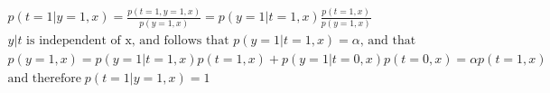 

	
	
	\begin{answer}
\begin{align*}
p(t=1|y=1,x) = \frac{p(t=1,y=1,x)}{p(y=1,x)} = p(y=1|t=1,x) \frac{p(t=1,x)}{p(y=1,x)}\\
\text{$y|t$ is independent of x, and follows that $p(y=1|t=1,x)=\alpha$, and that}\\
p(y=1,x) = p(y=1|t=1,x)p(t=1,x) + p(y=1|t=0,x)p(t=0,x) = \alpha p(t=1,x)\\
\text{and therefore} \; p(t=1|y=1,x)=1
\end{align*}
	\end{answer}
